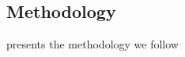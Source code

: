 \subsection{Methodology}\label{subsec: methodology}

\cite{carrera2022conduct} presents the methodology we follow